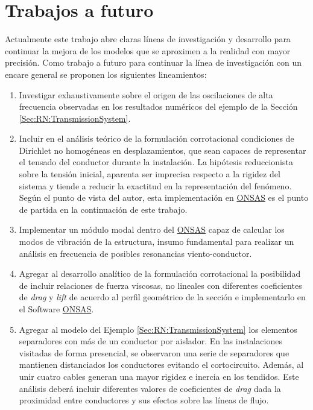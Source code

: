 \section{Trabajos a futuro}

Actualmente este trabajo abre claras líneas de investigación y desarrollo para continuar la mejora de los modelos que se aproximen a la realidad con mayor precisión. Como trabajo a futuro para continuar la línea de investigación con un encare general se proponen los siguientes lineamientos:

\begin{enumerate}
	\item Investigar exhaustivamente sobre el origen de las oscilaciones de alta frecuencia observadas en los resultados numéricos del ejemplo de la Sección \ref{Sec:RN:TransmissionSystem}.
	\item Incluir en el análisis teórico de la formulación corrotacional condiciones de Dirichlet no homogéneas en desplazamientos, que sean capaces de representar el tensado del conductor durante la instalación. La hipótesis reduccionista sobre la tensión inicial, aparenta ser imprecisa respecto a la rigidez del sistema y tiende a reducir la exactitud en la representación del fenómeno. Según el punto de vista del autor, esta implementación en \href{https://github.com/ONSAS/ONSAS.m/}{ONSAS} es el punto de partida en la continuación de este trabajo. 
	\item Implementar un módulo modal dentro del \href{https://github.com/ONSAS/ONSAS.m/}{ONSAS} capaz de calcular los modos de vibración de la estructura, insumo fundamental para realizar un análisis en frecuencia de posibles resonancias viento-conductor.
	\item Agregar al desarrollo analítico de la formulación corrotacional la posibilidad de incluir relaciones de fuerza viscosas, no lineales con diferentes coeficientes de \textit{drag} y \textit{lift} de acuerdo al perfil geométrico de la sección e implementarlo en el Software \href{https://github.com/ONSAS/ONSAS.m/}{ONSAS}.
	\item Agregar al modelo del Ejemplo \ref{Sec:RN:TransmissionSystem} los elementos separadores con más de un conductor por aislador. En las instalaciones visitadas de forma presencial, se observaron una serie de separadores que mantienen distanciados los conductores evitando el cortocircuito. Además, al unir cuatro cables generan una mayor rigidez e inercia en los tendidos. Este análisis deberá incluir diferentes valores de coeficientes de \textit{drag} dada la proximidad entre conductores y sus efectos sobre las líneas de flujo.  

\end{enumerate}

